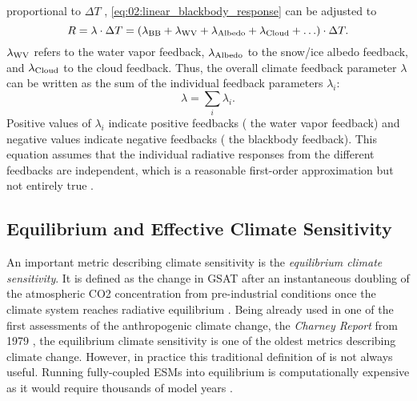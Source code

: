 proportional to $\Delta T$ \autocite{Gregory2008a},
\cref{eq:02:linear_blackbody_response} can be adjusted to
\begin{equation}
  R = \lambda \cdot \Delta T = \left( \lambda_{\textnormal{BB}} +
  \lambda_{\textnormal{WV}} + \lambda_{\textnormal{Albedo}} + \lambda_{\textnormal{Cloud}} +
  \ldots \right) \cdot \Delta T.
  \label{eq:02:linear_response}
\end{equation}
$\lambda_{\textnormal{WV}}$ refers to the water vapor feedback,
$\lambda_{\textnormal{Albedo}}$ to the snow/ice albedo feedback, and
$\lambda_{\textnormal{Cloud}}$ to the cloud feedback. Thus, the overall climate
feedback parameter $\lambda$ can be written as the sum of the individual
feedback parameters $\lambda_i$:
\begin{equation}
  \lambda = \sum_i \lambda_i.
  \label{eq:02:lambda_as_sum_of_lambdas}
\end{equation}
Positive values of $\lambda_i$ indicate positive feedbacks (\eg{} the water
vapor feedback) and negative values indicate negative feedbacks (\eg{} the
blackbody feedback). This equation assumes that the individual radiative
responses from the different feedbacks are independent, which is a reasonable
first-order approximation but not entirely true \autocite{Soden2008}.

\subsection{Equilibrium and Effective Climate Sensitivity}
\label{subsec:02:ecs}

An important metric describing climate sensitivity is the \emph{equilibrium
  climate sensitivity}. It is defined as the change in \ac{GSAT} after an
instantaneous doubling of the atmospheric \ac{CO2} concentration from
pre-industrial conditions once the climate system reaches radiative equilibrium
\autocite{Bindoff2013}. Being already used in one of the first assessments of
the anthropogenic climate change, the \emph{Charney Report} from 1979
\autocite{Charney1979}, the equilibrium climate sensitivity is one of the
oldest metrics describing climate change. However, in practice this traditional
definition of is not always useful. Running fully-coupled \acp{ESM} into
equilibrium is computationally expensive as it would require thousands of model
years \autocite{Rugenstein2020}.

